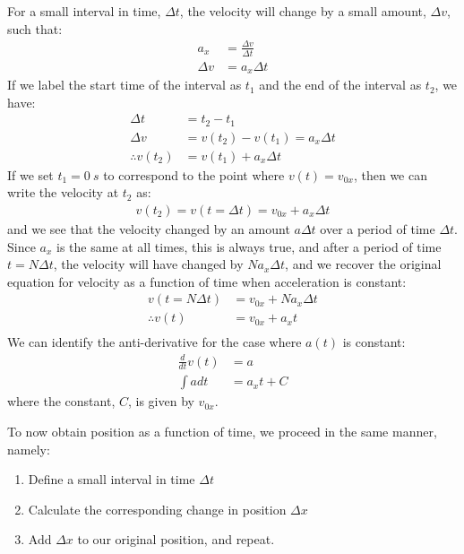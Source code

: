 For a small interval in time, $\Delta t$, the velocity will change by a small amount, $\Delta v$, such that:
\begin{align*}
a_x &= \frac{\Delta v}{\Delta t}\\
\Delta v &= a_x \Delta t
\end{align*}
If we label the start time of the interval as $t_1$ and the end of the interval as $t_2$, we have:
\begin{align*}
\Delta t &= t_2 - t_1 \\
\Delta v &= v(t_2) - v(t_1) = a_x \Delta t\\
\therefore v(t_2) &= v(t_1)+a_x\Delta t
\end{align*}
If we set $t_1=\SI{0}{s}$ to correspond to the point where $v(t)=v_{0x}$, then we can write the velocity at $t_2$ as:
\begin{align*}
v(t_2) = v(t=\Delta t) = v_{0x}+a_x\Delta t
\end{align*}
and we see that the velocity changed by an amount $a \Delta t$ over a period of time $\Delta t$. Since $a_x$ is the same at all times, this is always true, and after a period of time $t = N\Delta t$, the velocity will have changed by $N a_x \Delta t$, and we recover the original equation for velocity as a function of time when acceleration is constant:
\begin{align*}
v(t=N \Delta t) &= v_{0x}+Na_x\Delta t\\
\therefore v(t) &= v_{0x}+a_xt\\
\end{align*}
We can identify the anti-derivative for the case where $a(t)$ is constant:
\begin{align*}
\frac{d}{dt} v(t) &=a\\
\int a dt &=a_xt +C
\end{align*}
where the constant, $C$, is given by $v_{0x}$.

To now obtain position as a function of time, we proceed in the same manner, namely:
\begin{enumerate}
\item Define a small interval in time $\Delta t$
\item Calculate the corresponding change in position $\Delta x$
\item Add $\Delta x$ to our original position, and repeat.
\end{enumerate}

